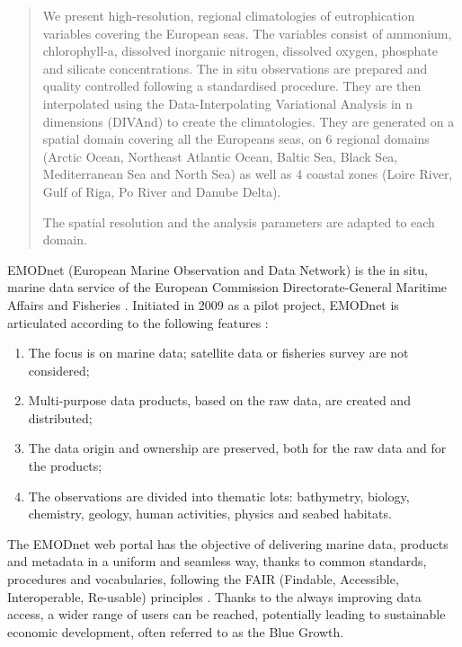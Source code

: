 \documentclass[essd, manuscript]{copernicus}
\begin{document}
\begin{abstract}
We present high-resolution, regional climatologies of eutrophication variables covering the European seas. The variables consist of ammonium, chlorophyll-a, dissolved inorganic nitrogen, dissolved oxygen, phosphate and silicate concentrations. The in situ observations are prepared and quality controlled following a standardised procedure. They are then interpolated using the Data-Interpolating Variational Analysis in n dimensions (DIVAnd) to create the climatologies. They are generated on a spatial domain covering all the Europeans seas, on 6 regional domains (Arctic Ocean, Northeast Atlantic Ocean, Baltic Sea, Black Sea, Mediterranean Sea and North Sea) as well as 4 coastal zones (Loire River, Gulf of Riga, Po River and Danube Delta).

The spatial resolution and the analysis parameters are adapted to each domain.
\end{abstract}


\introduction  %

EMODnet (European Marine Observation and Data Network) is the in situ, marine data service of the European Commission Directorate-General Maritime Affairs and Fisheries \citep{MartinMiguez2019}. Initiated in 2009 as a pilot project, EMODnet is articulated according to the following features \citet{Shepherd2018}: 
\begin{enumerate}
\item The focus is on marine data; satellite data or fisheries survey are not considered; 
\item Multi-purpose data products, based on the raw data, are created and distributed; 
\item The data origin and ownership are preserved, both for the raw data and for the products; 
\item The observations are divided into thematic lots: bathymetry, biology, chemistry, geology, human activities, physics and seabed habitats. 
\end{enumerate} 

The EMODnet web portal has the objective of delivering marine data, products and metadata in a uniform and seamless way, thanks to common standards, procedures and vocabularies, following the
FAIR (Findable, Accessible, Interoperable, Re-usable) principles \citep {Wilkinson2016,Wilkinson2019}. Thanks to the always improving data access, a wider range of users can be reached, potentially leading to sustainable economic development, often referred to as the Blue Growth. 
\end{document}
